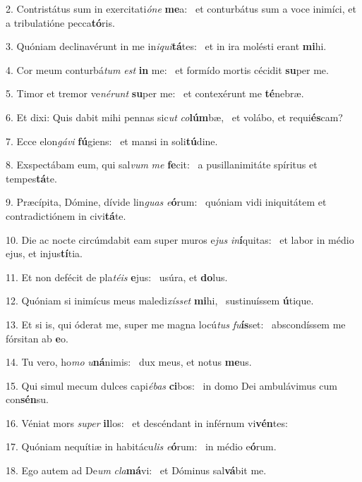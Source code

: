 2. Contristátus sum in exercitati\textit{ó}\textit{ne} \textbf{me}a: \ast\  et conturbátus sum a voce inimíci, et a tribulatióne pecca\textbf{tó}ris.\

3. Quóniam declinavérunt in me in\textit{i}\textit{qui}\textbf{tá}tes: \ast\  et in ira molésti erant \textbf{mi}hi.\

4. Cor meum conturbá\textit{tum} \textit{est} \textbf{in} me: \ast\  et formído mortis cécidit \textbf{su}per me.\

5. Timor et tremor ve\textit{né}\textit{runt} \textbf{su}per me: \ast\  et contexérunt me \textbf{té}nebræ.\

6. Et dixi: Quis dabit mihi pennas sic\textit{ut} \textit{co}\textbf{lúm}bæ, \ast\  et volábo, et requi\textbf{és}cam?\

7. Ecce elon\textit{gá}\textit{vi} \textbf{fú}giens: \ast\  et mansi in soli\textbf{tú}dine.\

8. Exspectábam eum, qui sal\textit{vum} \textit{me} \textbf{fe}cit: \ast\  a pusillanimitáte spíritus et tempes\textbf{tá}te.\

9. Præcípita, Dómine, dívide lin\textit{guas} \textit{e}\textbf{ó}rum: \ast\  quóniam vidi iniquitátem et contradictiónem in civi\textbf{tá}te.\

10. Die ac nocte circúmdabit eam super muros e\textit{jus} \textit{in}\textbf{í}quitas: \ast\  et labor in médio ejus, et injus\textbf{tí}tia.\

11. Et non defécit de pla\textit{té}\textit{is} \textbf{e}jus: \ast\  usúra, et \textbf{do}lus.\

12. Quóniam si inimícus meus maledi\textit{xís}\textit{set} \textbf{mi}hi, \ast\  sustinuíssem \textbf{ú}tique.\

13. Et si is, qui óderat me, super me magna locú\textit{tus} \textit{fu}\textbf{ís}set: \ast\  abscondíssem me fórsitan ab \textbf{e}o.\

14. Tu vero, ho\textit{mo} \textit{u}\textbf{ná}nimis: \ast\  dux meus, et notus \textbf{me}us.\

15. Qui simul mecum dulces capi\textit{é}\textit{bas} \textbf{ci}bos: \ast\  in domo Dei ambulávimus cum con\textbf{sén}su.\

16. Véniat mors \textit{su}\textit{per} \textbf{il}los: \ast\  et descéndant in inférnum vi\textbf{vén}tes:\

17. Quóniam nequítiæ in habitácu\textit{lis} \textit{e}\textbf{ó}rum: \ast\  in médio e\textbf{ó}rum.\

18. Ego autem ad De\textit{um} \textit{cla}\textbf{má}vi: \ast\  et Dóminus sal\textbf{vá}bit me.\

